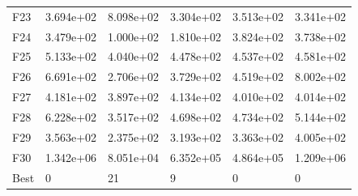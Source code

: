 \begin{tabular}{llllll}
F23  &  3.694e+02 &  8.098e+02 &  3.304e+02 &  3.513e+02 &  3.341e+02 \\
F24  &  3.479e+02 &  1.000e+02 &  1.810e+02 &  3.824e+02 &  3.738e+02 \\
F25  &  5.133e+02 &  4.040e+02 &  4.478e+02 &  4.537e+02 &  4.581e+02 \\
F26  &  6.691e+02 &  2.706e+02 &  3.729e+02 &  4.519e+02 &  8.002e+02 \\
F27  &  4.181e+02 &  3.897e+02 &  4.134e+02 &  4.010e+02 &  4.014e+02 \\
F28  &  6.228e+02 &  3.517e+02 &  4.698e+02 &  4.734e+02 &  5.144e+02 \\
F29  &  3.563e+02 &  2.375e+02 &  3.193e+02 &  3.363e+02 &  4.005e+02 \\
F30  &  1.342e+06 &  8.051e+04 &  6.352e+05 &  4.864e+05 &  1.209e+06 \\
Best &          0 &         21 &          9 &          0 &          0 \\
\bottomrule
\end{tabular}
